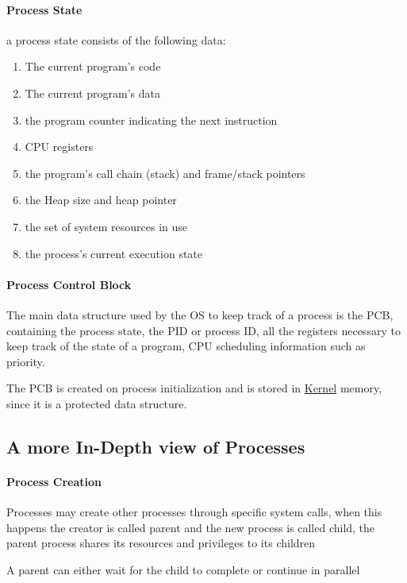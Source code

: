 \documentclass[openright, twoside]{report}
\theoremstyle{definition}
\theoremstyle{example}
\begin{document}
				\paragraph{Process State} a process state consists of the following data:
				\begin{enumerate}
					\item The current program's code
					\item The current program's data 
					\item the program counter indicating the next instruction 
					\item CPU registers 
					\item the program's call chain (stack) and frame/stack pointers 
					\item the Heap size and heap pointer 
					\item the set of system resources in use
					\item the process's current execution state
				\end{enumerate}

				\paragraph{Process Control Block}\label{par:PCB}
				The main data structure used by the OS to keep track of a process is 
				the PCB, containing the process state, the PID or process ID,
				all the registers necessary to keep track of the state of a program, 
				CPU scheduling information such as priority.

				The PCB is created on process initialization and is stored in 
				\hyperref[par:kernel]{Kernel} memory, 
				since it is a protected data structure.

		\subsection{A more In-Depth view of Processes}
			\paragraph{Process Creation}\label{par:p_creation}
				Processes may create other processes through specific system calls, when this happens 
				the creator is called parent and the new process is called child, the parent process
				shares its resources and privileges to its children

				A parent can either wait for the child to complete or continue in parallel 
\end{document}
